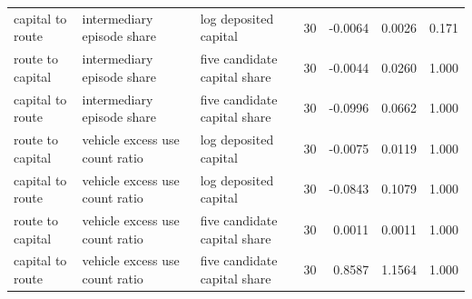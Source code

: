 \begin{tabular}{lllrrrr}
capital to route & intermediary episode share & log deposited capital & 30 & -0.0064 & 0.0026 & 0.171 \\
route to capital & intermediary episode share & five candidate capital share & 30 & -0.0044 & 0.0260 & 1.000 \\
capital to route & intermediary episode share & five candidate capital share & 30 & -0.0996 & 0.0662 & 1.000 \\
route to capital & vehicle excess use count ratio & log deposited capital & 30 & -0.0075 & 0.0119 & 1.000 \\
capital to route & vehicle excess use count ratio & log deposited capital & 30 & -0.0843 & 0.1079 & 1.000 \\
route to capital & vehicle excess use count ratio & five candidate capital share & 30 & 0.0011 & 0.0011 & 1.000 \\
capital to route & vehicle excess use count ratio & five candidate capital share & 30 & 0.8587 & 1.1564 & 1.000 \\
\bottomrule
\end{tabular}
